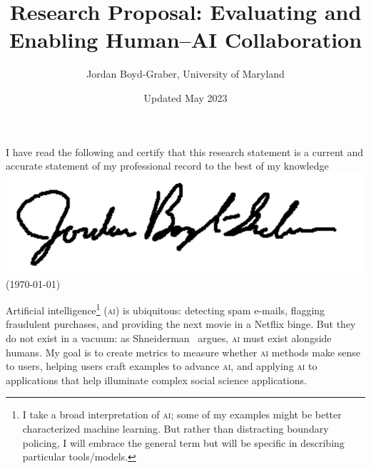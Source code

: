 \usepackage{graphicx}
\usepackage{amssymb}
\usepackage{mfirstuc}
\usepackage{colortbl}
\usepackage{epstopdf}
\usepackage{url}

\newcommand{\abr}[1]{\textsc{#1}}
\newcommand{\newcite}[2]{\capitalisewords{#1} et al.~\cite{#1-#2}}



\newcommand{\student}[1]{\vspace{.5cm}\fbox{\parbox{0.95\linewidth}{{\small
        #1}}}\vspace{.5cm}}
\providecommand{\blue}[1]{{\color{blue}{#1}}}
\providecommand{\red}[1]{{\color{red}{#1}}}
\providecommand{\green}[1]{{\color{green}{#1}}}



 \title{Research Proposal: Evaluating and Enabling Human--AI Collaboration}

 \author{Jordan Boyd-Graber, University of Maryland}


\date{Updated May 2023}

\maketitle

\ifumd
\vspace{.2cm}
  \parbox{\linewidth}{I have read the following and certify that this
  research statement is a current and accurate statement of my
  professional record to the best of my
  knowledge \flushright  \includegraphics[width=.2\linewidth]{resume_src/signature} \\
\flushright  (\today{})}
\vspace{.5cm}
\fi


Artificial intelligence\footnote{I take a broad interpretation of
\abr{ai}; some of my examples might be better characterized machine
learning.  But rather than distracting boundary policing, I will embrace
the general term but will be specific in describing particular tools/models.}
(\abr{ai}) is ubiquitous: detecting spam e-mails, flagging fraudulent
purchases, and providing the next movie in a Netflix binge.
%
But they do not exist in a vacuum: as
Shneiderman~\cite{shneiderman-21} argues, \abr{ai} must exist
alongside humans.
%
My goal is to create metrics to measure whether \abr{ai} methods make
sense to users, helping users craft examples to advance \abr{ai}, and
applying \abr{ai} to applications that help illuminate complex social
science applications.

